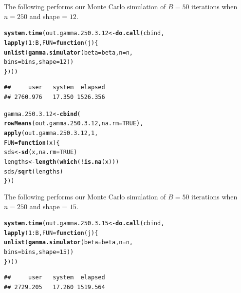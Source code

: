 \documentclass[11pt]{article}\usepackage[]{graphicx}\usepackage[]{color}
\makeatletter
\newcommand{\hlnum}[1]{\textcolor[rgb]{0.686,0.059,0.569}{#1}}%
\newcommand{\hlopt}[1]{\textcolor[rgb]{0,0,0}{#1}}%
\newcommand{\hlstd}[1]{\textcolor[rgb]{0.345,0.345,0.345}{#1}}%
\newcommand{\hlkwa}[1]{\textcolor[rgb]{0.161,0.373,0.58}{\textbf{#1}}}%
\newcommand{\hlkwb}[1]{\textcolor[rgb]{0.69,0.353,0.396}{#1}}%
\newcommand{\hlkwc}[1]{\textcolor[rgb]{0.333,0.667,0.333}{#1}}%
\newcommand{\hlkwd}[1]{\textcolor[rgb]{0.737,0.353,0.396}{\textbf{#1}}}%
\newenvironment{kframe}{%
 \def\at@end@of@kframe{}%
 \ifinner\ifhmode%
  \def\at@end@of@kframe{\end{minipage}}%
  \begin{minipage}{\columnwidth}%
 \fi\fi%
 \def\FrameCommand##1{\hskip\@totalleftmargin \hskip-\fboxsep
 \colorbox{shadecolor}{##1}\hskip-\fboxsep
     \hskip-\linewidth \hskip-\@totalleftmargin \hskip\columnwidth}%
 \MakeFramed {\advance\hsize-\width
   \@totalleftmargin\z@ \linewidth\hsize
   \@setminipage}}%
 {\par\unskip\endMakeFramed%
 \at@end@of@kframe}
\newenvironment{knitrout}{}{} %
\makeatother
\begin{document}
The following performs our Monte Carlo simulation of $B = 50$ iterations 
when $n = 250$ and shape = $12$.

\begin{knitrout}
\color{fgcolor}\begin{kframe}
\begin{alltt}
\hlkwd{system.time}\hlstd{(out.gamma.250.3.12} \hlkwb{<-} \hlkwd{do.call}\hlstd{(cbind,}
  \hlkwd{lapply}\hlstd{(}\hlnum{1}\hlopt{:}\hlstd{B,} \hlkwc{FUN} \hlstd{=} \hlkwa{function}\hlstd{(}\hlkwc{j}\hlstd{)\{}
    \hlkwd{unlist}\hlstd{(}\hlkwd{gamma.simulator}\hlstd{(}\hlkwc{beta} \hlstd{= beta,} \hlkwc{n} \hlstd{= n,}
      \hlkwc{bins} \hlstd{= bins,} \hlkwc{shape} \hlstd{=} \hlnum{12}\hlstd{))}
\hlstd{\})))}
\end{alltt}
\begin{verbatim}
##     user   system  elapsed 
## 2760.976   17.350 1526.356
\end{verbatim}
\end{kframe}
\end{knitrout}

\begin{knitrout}
\color{fgcolor}\begin{kframe}
\begin{alltt}
\hlstd{gamma.250.3.12} \hlkwb{<-} \hlkwd{cbind}\hlstd{(}
  \hlkwd{rowMeans}\hlstd{(out.gamma.250.3.12,} \hlkwc{na.rm} \hlstd{=} \hlnum{TRUE}\hlstd{),}
  \hlkwd{apply}\hlstd{(out.gamma.250.3.12,} \hlnum{1}\hlstd{,}
  \hlkwc{FUN} \hlstd{=} \hlkwa{function}\hlstd{(}\hlkwc{x}\hlstd{)\{}
    \hlstd{sds} \hlkwb{<-} \hlkwd{sd}\hlstd{(x,} \hlkwc{na.rm} \hlstd{=} \hlnum{TRUE}\hlstd{)}
    \hlstd{lengths} \hlkwb{<-} \hlkwd{length}\hlstd{(}\hlkwd{which}\hlstd{(}\hlopt{!}\hlkwd{is.na}\hlstd{(x)))}
    \hlstd{sds} \hlopt{/} \hlkwd{sqrt}\hlstd{(lengths)}
  \hlstd{\}))}
\end{alltt}
\end{kframe}
\end{knitrout}

The following performs our Monte Carlo simulation of $B = 50$ iterations 
when $n = 250$ and shape = $15$.

\begin{knitrout}
\color{fgcolor}\begin{kframe}
\begin{alltt}
\hlkwd{system.time}\hlstd{(out.gamma.250.3.15} \hlkwb{<-} \hlkwd{do.call}\hlstd{(cbind,}
  \hlkwd{lapply}\hlstd{(}\hlnum{1}\hlopt{:}\hlstd{B,} \hlkwc{FUN} \hlstd{=} \hlkwa{function}\hlstd{(}\hlkwc{j}\hlstd{)\{}
    \hlkwd{unlist}\hlstd{(}\hlkwd{gamma.simulator}\hlstd{(}\hlkwc{beta} \hlstd{= beta,} \hlkwc{n} \hlstd{= n,}
      \hlkwc{bins} \hlstd{= bins,} \hlkwc{shape} \hlstd{=} \hlnum{15}\hlstd{))}
\hlstd{\})))}
\end{alltt}
\begin{verbatim}
##     user   system  elapsed 
## 2729.205   17.260 1519.564
\end{verbatim}
\end{kframe}
\end{knitrout}
\end{document}
